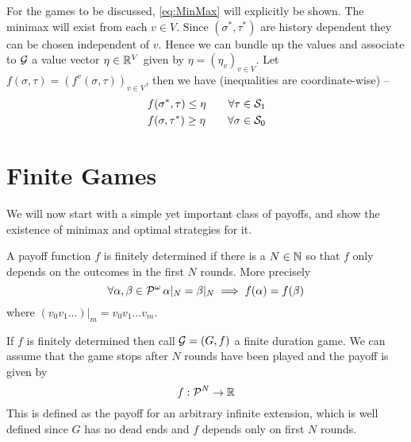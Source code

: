For the games to be discussed, \eqref{eq:MinMax} will explicitly be shown. The minimax will exist from each $v \in V$.  Since $(\sigma^*,\tau^*)$ are history dependent they can be chosen independent of $v$. Hence we can bundle up the values and associate to $\G$ a value vector $\eta \in \Reals^V$ given by $\eta = (\eta_v)_{v\in V}$. Let $f(\sigma,\tau) = (f^v(\sigma,\tau))_{v \in V}$, then we have (inequalities are coordinate-wise) --
\begin{equation}
    \begin{aligned}
    f(\sigma^*, \tau) \leq \eta \qquad \forall \tau \in \ST{1}\\
    f(\sigma,\tau^*) \geq \eta \qquad \forall \sigma \in \ST{0}
    \end{aligned}\label{eq:vecMinMax}
\end{equation}

\section{Finite Games}
\label{sec:finitegames}

We will now start with a simple yet important class of payoffs, and show the existence of minimax and optimal strategies for it.

A payoff function $f$ is finitely determined if there is a $N \in \Nat$ so that $f$ only depends on the outcomes in the first $N$ rounds. More precisely
\[
    \forall \alpha,\beta \in \PI\, \alpha|_N=\beta|_N \implies f(\alpha) = f(\beta)
\]
where $( v_0 v_1 \ldots )|_m = v_0v_1 \ldots v_m$.

If $f$ is finitely determined then call $\G=(G,f)$ a finite duration game. We can assume that the game stops after $N$ rounds have been played and the payoff is given by
\[
    f : \PF[N] \to \Reals
\]
This is defined as the payoff for an arbitrary infinite extension, which is well defined since $G$ has no dead ends and $f$ depends only on first $N$ rounds.

